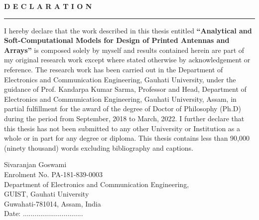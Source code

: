 \begin{center}
{\bf \large D E C L A R A T I O N}
\end{center}
\rule{\linewidth}{2mm} \pagestyle{empty} \vspace{0.25in}
\par

I hereby declare that the work described in this thesis entitled {\bf ``Analytical and Soft-Computational Models for Design of Printed Antennas and Arrays''} is composed solely by myself and results contained herein are part of my original research work except where stated otherwise by acknowledgement or reference. The research work has been carried out in the Department of Electronics and Communication Engineering, Gauhati University, under the guidance of Prof. Kandarpa Kumar Sarma, Professor and Head, Department of Electronics and Communication Engineering, Gauhati University, Assam, in partial fulfillment for the award of the degree of Doctor of Philosophy (Ph.D) during the period from September, 2018 to March, 2022. I further declare that this thesis has not been submitted to any other University or Institution as a whole or in part for any degree or diploma. This thesis contains less than 90,000 (ninety thousand) words excluding bibliography and captions.

\vspace*{30mm}



\bigskip\medskip

\noindent Sivaranjan Goswami\\ Enrolment No. PA-181-839-0003\\Department of Electronics and Communication Engineering, \\ GUIST, Gauhati University\\ Guwahati-781014, Assam, India\\
Date: ............................... \\

\noindent





